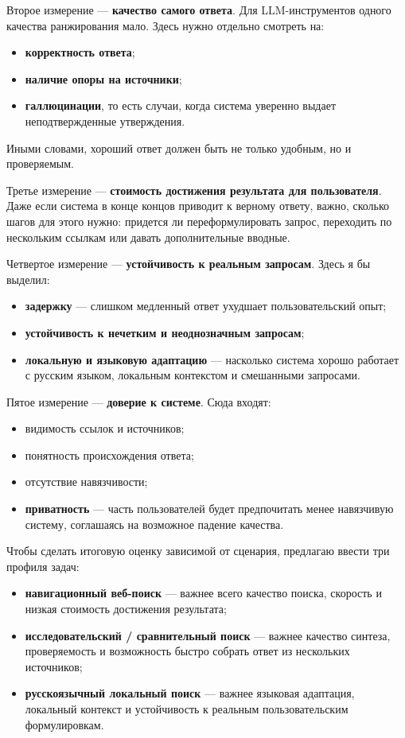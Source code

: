 \documentclass[10pt]{article}
\begin{document}
Второе измерение --- \textbf{качество самого ответа}. Для LLM-инструментов одного качества ранжирования мало. Здесь нужно отдельно смотреть на:
\begin{itemize}
\item \textbf{корректность ответа};
\item \textbf{наличие опоры на источники};
\item \textbf{галлюцинации}, то есть случаи, когда система уверенно выдает неподтвержденные утверждения.
\end{itemize}
Иными словами, хороший ответ должен быть не только удобным, но и проверяемым.

Третье измерение --- \textbf{стоимость достижения результата для пользователя}. Даже если система в конце концов приводит к верному ответу, важно, сколько шагов для этого нужно: придется ли переформулировать запрос, переходить по нескольким ссылкам или давать дополнительные вводные.

Четвертое измерение --- \textbf{устойчивость к реальным запросам}. Здесь я бы выделил:
\begin{itemize}
\item \textbf{задержку} --- слишком медленный ответ ухудшает пользовательский опыт;
\item \textbf{устойчивость к нечетким и неоднозначным запросам};
\item \textbf{локальную и языковую адаптацию} --- насколько система хорошо работает с русским языком, локальным контекстом и смешанными запросами.
\end{itemize}

Пятое измерение --- \textbf{доверие к системе}. Сюда входят:
\begin{itemize}
\item видимость ссылок и источников;
\item понятность происхождения ответа;
\item отсутствие навязчивости;
\item \textbf{приватность} --- часть пользователей будет предпочитать менее навязчивую систему, соглашаясь на возможное падение качества.
\end{itemize}

Чтобы сделать итоговую оценку зависимой от сценария, предлагаю ввести три профиля задач:
\begin{itemize}
\item \textbf{навигационный веб-поиск} --- важнее всего качество поиска, скорость и низкая стоимость достижения результата;
\item \textbf{исследовательский / сравнительный поиск} --- важнее качество синтеза, проверяемость и возможность быстро собрать ответ из нескольких источников;
\item \textbf{русскоязычный локальный поиск} --- важнее языковая адаптация, локальный контекст и устойчивость к реальным пользовательским формулировкам.
\end{itemize}
\end{document}
